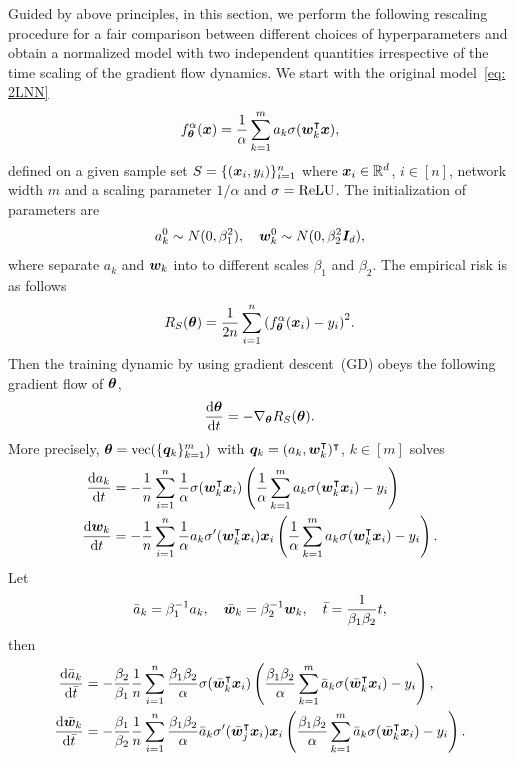 \documentclass{article}
\begin{document}
Guided by above principles, in this section, we perform the following rescaling procedure for a fair comparison between different choices of hyperparameters and obtain a normalized model with two independent quantities irrespective of the time scaling of the gradient flow dynamics.
We start with the original model~\eqref{eq: 2LNN}
\begin{equation}
    f^{\alpha}_{\bm{\theta}}(\bm{x}) = \frac{1}{\alpha}\sum_{k=1}^{m}a_k\sigma(\bm{w}_k^{\intercal}\bm{x}),
\end{equation}
defined on a given sample set $S=\{(\bm{x}_i,y_i)\}_{i=1}^n$ where $\bm{x}_i\in\mathbb{R}^d$, $i\in[n]$, network width $m$ and a scaling parameter $1/\alpha$ and $\sigma=\mathrm{ReLU}$. The initialization of parameters are
\begin{equation}
    a_k^0\sim N(0, \beta_1^2), \quad \bm{w}_k^0\sim N(0, \beta_2^2 \bm{I}_d),
\end{equation}
where separate $a_k$ and $\bm{w}_k$ into to different scales $\beta_1$ and $\beta_2$. The empirical risk is as follows
\begin{equation}
    R_S(\bm{\theta})=\frac{1}{2n}\sum_{i=1}^n {(f^{\alpha}_{\bm{\theta}}(\bm{x}_i)-y_i)}^2.
\end{equation}
Then the training dynamic by using gradient descent~(GD) obeys the following gradient flow of $\bm{\theta}$,
\begin{equation}
    \frac{\mathrm{d} \bm{\theta}}{\mathrm{d} t}=-\nabla_{\bm{\theta}}R_S(\bm{\theta}).
\end{equation}
More precisely, $\bm{\theta}=\mathrm{vec}(\{\bm{q}_k\}_{k=1}^m)$ with $\bm{q}_k=(a_k,\bm{w}_k^{\intercal})^\intercal$, $k\in[m]$ solves
\begin{align*}
    \frac{\mathrm{d} a_k}{\mathrm{d} t}
     & = -\frac{1}{n}\sum_{i=1}^n\frac{1}{\alpha}\sigma(\bm{w}_k^{\intercal}\bm{x}_i) \left(\frac{1}{\alpha}\sum_{k=1}^{m}a_k\sigma(\bm{w}_k^{\intercal}\bm{x}_i)-y_i\right)           \\
    \frac{\mathrm{d} \bm{w}_k}{\mathrm{d} t}
     & = -\frac{1}{n}\sum_{i=1}^n\frac{1}{\alpha} a_k\sigma'(\bm{w}_k^{\intercal}\bm{x}_i)\bm{x}_i \left(\frac{1}{\alpha}\sum_{k=1}^{m}a_k\sigma(\bm{w}_k^{\intercal}\bm{x}_i)-y_i\right).
\end{align*}
Let
\begin{equation}
    \bar{a}_k=\beta_1^{-1}a_k, \quad \bar{\bm{w}}_k=\beta_2^{-1}\bm{w}_k,\quad \bar{t}=\frac{1}{\beta_1\beta_2}t,
\end{equation}
then
\begin{align*}
    \frac{\mathrm{d} \bar{a}_k}{\mathrm{d} \bar{t}}
     & = -\frac{\beta_2}{\beta_1}\frac{1}{n}\sum_{i=1}^n \frac{\beta_1\beta_2}{\alpha}\sigma(\bar{\bm{w}}_k^\intercal\bm{x}_i) \left(\frac{\beta_1\beta_2}{\alpha}\sum_{k=1}^{m}\bar{a}_k\sigma(\bar{\bm{w}}_k^\intercal\bm{x}_i)-y_i\right),         \\
    \frac{\mathrm{d} \bar{\bm{w}}_k}{\mathrm{d} \bar{t}}
     & = -\frac{\beta_1}{\beta_2}\frac{1}{n}\sum_{i=1}^n\frac{\beta_1\beta_2}{\alpha}\bar{a}_k\sigma'(\bar{\bm{w}}_j^\intercal\bm{x}_i)\bm{x}_i \left(\frac{\beta_1\beta_2}{\alpha}\sum_{k=1}^{m}\bar{a}_k\sigma(\bar{\bm{w}}_k^\intercal\bm{x}_i)-y_i\right).
\end{align*}
\end{document}
